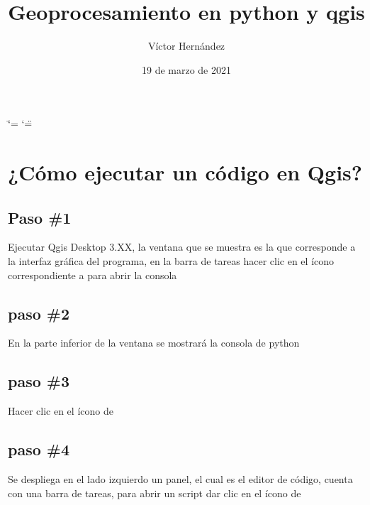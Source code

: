 \documentclass[letterpaper,10pt,spanish]{sphinxmanual}
\title{Geoprocesamiento en python y qgis}
\date{19 de marzo de 2021}
\author{Víctor Hernández}
\begin{document}
\ifdefined\shorthandoff
  \ifnum\catcode`\=\string=\active\shorthandoff{=}\fi
  \ifnum\catcode`\"=\active{}\fi
\fi

\pagestyle{empty}
\sphinxmaketitle
\pagestyle{plain}
\sphinxtableofcontents
\pagestyle{normal}
\label{\detokenize{index::doc}}



\chapter{¿Cómo ejecutar un código en Qgis?}
\label{\detokenize{ejecucion:como-ejecutar-un-codigo-en-qgis}}\label{\detokenize{ejecucion::doc}}

\section{Paso \#1}
\label{\detokenize{ejecucion:paso-1}}
Ejecutar Qgis Desktop 3.XX, la ventana que se muestra es la que
corresponde a la interfaz gráfica del programa, en la barra de tareas
hacer clic en el ícono correspondiente a  para abrir la consola

\noindent{}


\section{paso \#2}
\label{\detokenize{ejecucion:paso-2}}
En la parte inferior de la ventana se mostrará la consola de python

\noindent{}


\section{paso \#3}
\label{\detokenize{ejecucion:paso-3}}
Hacer clic en el ícono de 

\noindent{}


\section{paso \#4}
\label{\detokenize{ejecucion:paso-4}}
Se despliega en el lado izquierdo un panel, el cual es el editor
de código, cuenta con una barra de tareas, para abrir un script
dar clic en el ícono de 

\noindent{}
\end{document}
